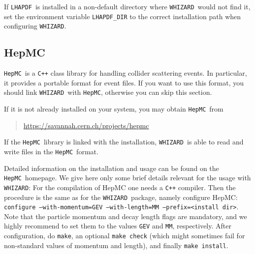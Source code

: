 \documentclass[12pt]{book}
\newcommand{\ttt}[1]{\texttt{#1}}
\newcommand{\whizard}{\texttt{WHIZARD}}
\newcommand{\lhapdf}{\texttt{LHAPDF}}
\newcommand{\hepmc}{\texttt{HepMC}}
\begin{document}
If \lhapdf\ is installed in a non-default directory where
\whizard\ would not find it, set the environment variable
\ttt{LHAPDF\_DIR} to the correct installation path when configuring
\whizard.


\subsection{HepMC}
\label{sec:hepmc}

\hepmc\ is a \ttt{C++} class library for handling collider scattering
events.  In particular, it provides a portable format for event files.
If you want to use this format, you should link \whizard\ with \hepmc,
otherwise you can skip this section.

If it is not already installed on your system, you may obtain
\hepmc\ from
\begin{quote}
  \url{https://savannah.cern.ch/projects/hepmc}
\end{quote}
If the \hepmc\ library is linked with the installation, \whizard\ is
able to read and write files in the \hepmc\ format.

Detailed information on the installation and usage can be found on the
\hepmc\ homepage. We give here only some brief details relevant for
the usage with \whizard: For the compilation of HepMC one needs a
\ttt{C++} compiler. Then the procedure is the same as for the
\whizard\ package, namely configure HepMC: \ttt{configure
  --with-momentum=GEV --with-length=MM --prefix=<install dir>}. Note
that the particle momentum and decay length flags are mandatory, and
we highly recommend to set them to the values \ttt{GEV} and \ttt{MM},
respectively. After configuration, do \ttt{make}, an optional
\ttt{make check} (which might sometimes fail for non-standard values
of momentum and length), and finally \ttt{make install}.
\end{document}
